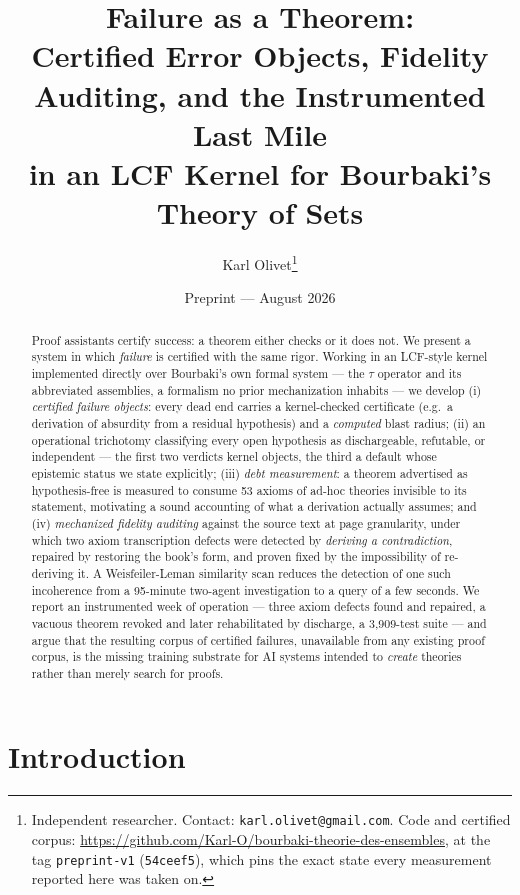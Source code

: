 \documentclass[11pt]{article}
\title{Failure as a Theorem:\\
Certified Error Objects, Fidelity Auditing, and the Instrumented Last Mile\\
in an LCF Kernel for Bourbaki's Theory of Sets}
\author{Karl Olivet\thanks{Independent researcher. Contact:
\texttt{karl.olivet@gmail.com}. Code and certified corpus: \url{https://github.com/Karl-O/bourbaki-theorie-des-ensembles}, at the tag
\texttt{preprint-v1} (\texttt{54ceef5}), which pins the exact state every measurement
reported here was taken on.}}
\date{Preprint --- August 2026}
\theoremstyle{remark}\newtheorem{example}{Example}
\begin{document}
\maketitle

\begin{abstract}
Proof assistants certify success: a theorem either checks or it does not. We present a
system in which \emph{failure} is certified with the same rigor. Working in an LCF-style
kernel implemented directly over Bourbaki's own formal system --- the $\tau$ operator
and its abbreviated assemblies, a formalism no prior mechanization inhabits --- we
develop (i) \emph{certified
failure objects}: every dead end carries a kernel-checked certificate (e.g.\ a derivation
of absurdity from a residual hypothesis) and a \emph{computed} blast radius; (ii) an
operational trichotomy classifying every open hypothesis as dischargeable, refutable, or
independent --- the first two verdicts kernel objects, the third a default whose epistemic
status we state explicitly; (iii) \emph{debt measurement}: a theorem
advertised as hypothesis-free is measured to consume 53 axioms of ad-hoc theories
invisible to its statement, motivating a sound accounting of what a derivation actually
assumes; and (iv) \emph{mechanized fidelity auditing} against the source text at
page granularity, under which two axiom transcription defects were detected by
\emph{deriving a contradiction}, repaired by restoring the book's form, and proven fixed
by the impossibility of re-deriving it. A Weisfeiler-Leman similarity scan reduces the
detection of one such incoherence from a 95-minute two-agent investigation to a
query of a few seconds.
We report an instrumented week of operation --- three axiom defects found and repaired,
a vacuous theorem revoked and later rehabilitated by discharge, a 3{,}909-test suite ---
and argue that the resulting corpus of certified failures, unavailable from any existing
proof corpus, is the missing training substrate for AI systems intended to \emph{create}
theories rather than merely search for proofs.
\end{abstract}

\section{Introduction}
\end{document}

